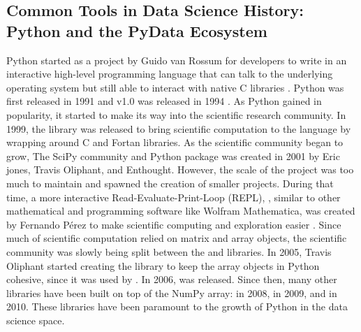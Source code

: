 \documentclass[010-intro.tex]{subfiles}
\begin{document}
    \subsection{Common Tools in Data Science History: Python and the PyData Ecosystem}

        Python started as a project by Guido van Rossum for developers
        to write in an interactive high-level programming language that can
        talk to the underlying operating system but still able to interact with native C libraries
        \cite{severanceGuidoVanRossum2005}.
        Python was first released in 1991 and v1.0 was released in 1994
        \cite{severanceGuidoVanRossum2005}.
        As Python gained in popularity,
        it started to make its way into the scientific research community.
        In 1999, the  library was released to bring scientific computation to the language
        by wrapping around C and Fortan libraries.
        As the scientific community began to grow,
        The SciPy community and Python package was created in 2001 by Eric jones, Travis Oliphant, and Enthought.
        However, the scale of the  project was too much to maintain
        and spawned the creation of smaller  projects.
        During that time,
        a more interactive Read-Evaluate-Print-Loop (REPL),
        ,
        similar to other mathematical and programming software like Wolfram Mathematica,
        was created by Fernando Pérez to make scientific computing and exploration easier
        \cite{iPythondevelopmentteamHistory}.
        Since much of scientific computation relied on matrix and array objects,
        the scientific community was slowly being split between the  and  libraries.
        In 2005, Travis Oliphant started creating the  library to keep the array objects in Python cohesive,
        since it was used by .
        In 2006,  was released.
        Since then, many other libraries have been built on top of the NumPy array:
         in 2008,  in 2009, and  in 2010.
        These libraries have been paramount to the growth of Python in the data science space. %
\end{document}
